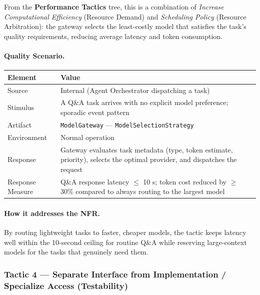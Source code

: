\documentclass[12pt,a4paper]{article}
\begin{document}
From the \textbf{Performance Tactics} tree, this is a combination of \textit{Increase Computational
Efficiency} (Resource Demand) and \textit{Scheduling Policy} (Resource Arbitration): the gateway
selects the least-costly model that satisfies the task's quality requirements, reducing
average latency and token consumption.

\paragraph{Quality Scenario.}

\begin{center}
\begin{tabular}{@{}L{3.5cm}L{9cm}@{}}
\toprule
\textbf{Element} & \textbf{Value} \\
\midrule
Source & Internal (Agent Orchestrator dispatching a task) \\
Stimulus & A Q\&A task arrives with no explicit model preference; sporadic event pattern \\
Artifact & \texttt{ModelGateway} --- \texttt{ModelSelectionStrategy} \\
Environment & Normal operation \\
Response & Gateway evaluates task metadata (type, token estimate, priority), selects the optimal provider, and dispatches the request \\
Response Measure & Q\&A response latency $\leq$ 10 s; token cost reduced by $\geq$ 30\% compared to always routing to the largest model \\
\bottomrule
\end{tabular}
\end{center}

\paragraph{How it addresses the NFR.}
By routing lightweight tasks to faster, cheaper models, the tactic keeps latency well within the
10-second ceiling for routine Q\&A while reserving large-context models for the tasks that
genuinely need them.

\subsubsection{Tactic 4 --- Separate Interface from Implementation / Specialize Access (Testability)}
\end{document}
